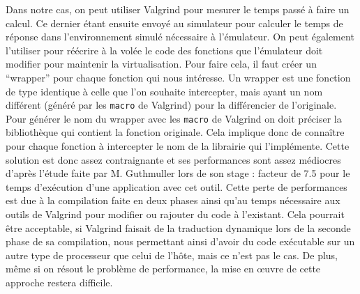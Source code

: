 Dans notre cas, on peut utiliser Valgrind pour mesurer le temps passé à faire un
calcul. Ce dernier étant ensuite envoyé au simulateur pour calculer le temps de
réponse dans l'environnement simulé nécessaire à l'émulateur. On peut
également l'utiliser pour réécrire à la volée le code des fonctions que
l'émulateur doit modifier pour maintenir la virtualisation. Pour faire cela, il
faut créer un ``wrapper'' pour chaque fonction qui nous intéresse. Un wrapper
est une fonction de type identique à celle que l'on souhaite intercepter, mais
ayant un nom différent (généré par les \texttt{macro} de Valgrind) pour la
différencier de l'originale. Pour générer le nom du wrapper avec
les \texttt{macro} de Valgrind on doit préciser la bibliothèque qui contient la
fonction originale. Cela implique donc de connaître pour chaque fonction à
intercepter le nom de la librairie qui l'implémente. Cette solution est donc
assez contraignante et ses performances sont assez médiocres d'après l'étude
faite par M. Guthmuller lors de son stage \citep{MARION:Interception}: facteur
de 7.5 pour le temps d'exécution d'une application avec cet outil. Cette perte
de performances est due à la compilation faite en deux phases ainsi qu'au temps
nécessaire aux outils de Valgrind pour modifier ou rajouter du code à
l'existant. Cela pourrait être acceptable, si Valgrind faisait de la traduction
dynamique lors de la seconde phase de sa compilation, nous permettant ainsi
d'avoir du code exécutable sur un autre type de processeur que celui de l'hôte,
mais ce n'est pas le cas. De plus, même si on résout le problème de
performance, la mise en \oe uvre de cette approche restera difficile.
